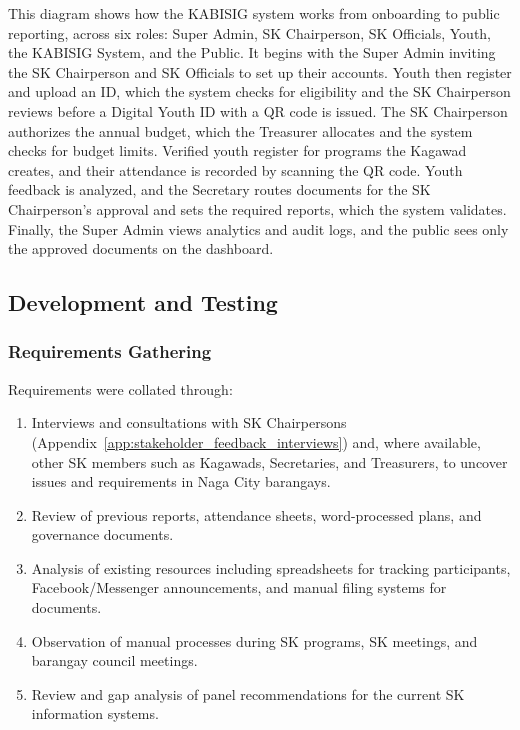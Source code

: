 \hspace*{\parindent}This diagram shows how the KABISIG system works from onboarding to public reporting, across six roles: Super Admin, SK Chairperson, SK Officials, Youth, the KABISIG System, and the Public. It begins with the Super Admin inviting the SK Chairperson and SK Officials to set up their accounts. Youth then register and upload an ID, which the system checks for eligibility and the SK Chairperson reviews before a Digital Youth ID with a QR code is issued. The SK Chairperson authorizes the annual budget, which the Treasurer allocates and the system checks for budget limits. Verified youth register for programs the Kagawad creates, and their attendance is recorded by scanning the QR code. Youth feedback is analyzed, and the Secretary routes documents for the SK Chairperson's approval and sets the required reports, which the system validates. Finally, the Super Admin views analytics and audit logs, and the public sees only the approved documents on the dashboard.
\vspace{5mm}

\subsection{Development and Testing}
\label{subsec:development_and_testing}

\subsubsection{Requirements Gathering}
\label{subsubsec:requirements_gathering}

\hspace*{\parindent}Requirements were collated through:
\begin{enumerate}
    \item Interviews and consultations with SK Chairpersons (Appendix~\ref{app:stakeholder_feedback_interviews}) and, where available, other SK members such as Kagawads, Secretaries, and Treasurers, to uncover issues and requirements in Naga City barangays.
    \item Review of previous reports, attendance sheets, word-processed plans, and governance documents.
    \item Analysis of existing resources including spreadsheets for tracking participants, Facebook/Messenger announcements, and manual filing systems for documents.
    \item Observation of manual processes during SK programs, SK meetings, and barangay council meetings.
    \item Review and gap analysis of panel recommendations for the current SK information systems.
\end{enumerate}
\vspace{3mm}

